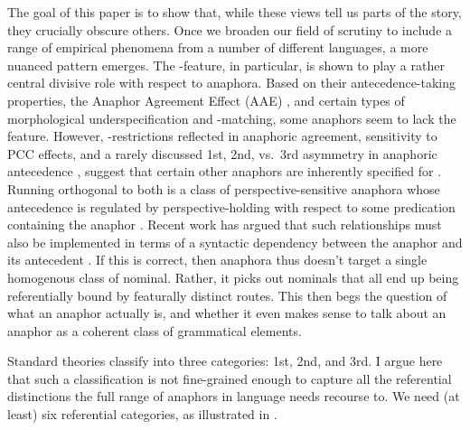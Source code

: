 \documentclass[output=paper, modfonts, nonflat]{langsci/langscibook}
\begin{document}
The goal of this paper is to show that, while these views tell us
parts of the story, they crucially obscure others. Once we broaden our
field of scrutiny to include a range of empirical phenomena from a
number of different languages, a more nuanced pattern emerges. The
\person-feature, in particular, is shown to play a rather central
divisive role with respect to anaphora. Based on their
antecedence-taking properties, the Anaphor Agreement Effect (AAE)
\citep{rizzi:1990}, and certain types of morphological
underspecification and \ph-matching, some anaphors seem to lack the
\person{} feature. However, \person-restrictions re\-flect\-ed in
anaphoric agreement, sensitivity to PCC effects, and a rarely
discussed 1st, 2nd, vs.\ 3rd asymmetry in anaphoric antecedence
\citep{comrie:1999}, suggest that certain other anaphors are
inherently specified for \person. Running orthogonal to both is a
class of perspective-sensitive anaphora \citep[including so-called
logophora][]{clements:1975} whose antecedence is regulated by
perspective-holding with respect to some predication containing the
anaphor \citep{sells:1987, kuno:1987, koopmansportiche:1989,
  giorgi:2010, pearson:2013}. Recent work has argued that such
relationships must also be implemented in terms of a syntactic
dependency between the anaphor and its antecedent
\citep{sundaresan:2012, pearson:2013, nishigauchi:2014,
  charnavel:2016}. If this is correct, then anaphora thus doesn't
target a single homogenous class of nominal. Rather, it picks out
nominals that all end up being referentially bound by featurally
distinct routes. This then begs the question of what an anaphor
actually is, and whether it even makes sense to talk about an anaphor
as a coherent class of grammatical elements.

\noindent Standard theories classify \person{} into three categories: 1st, 2nd,
and 3rd. I argue here that such a classification is not fine-grained
enough to capture all the referential distinctions the full range of
anaphors in language needs recourse to. We need (at least) six
referential categories, as illustrated in .
\end{document}
